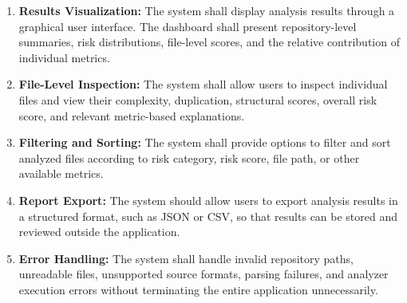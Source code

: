\begin{enumerate}
\begin{itemize}
        \item \textbf{Moderate:} 25--49
        \item \textbf{High:} 50--74
        \item \textbf{Critical:} 75--100
    \end{itemize}
    These categories represent heuristic estimates of potential maintenance concerns rather than the probability of software defects.
    \item \textbf{Results Visualization:} The system shall display analysis results through a graphical user interface. The dashboard shall present repository-level summaries, risk distributions, file-level scores, and the relative contribution of individual metrics.
    \item \textbf{File-Level Inspection:} The system shall allow users to inspect individual files and view their complexity, duplication, structural scores, overall risk score, and relevant metric-based explanations.
    \item \textbf{Filtering and Sorting:} The system shall provide options to filter and sort analyzed files according to risk category, risk score, file path, or other available metrics.
    \item \textbf{Report Export:} The system should allow users to export analysis results in a structured format, such as JSON or CSV, so that results can be stored and reviewed outside the application.
    \item \textbf{Error Handling:} The system shall handle invalid repository paths, unreadable files, unsupported source formats, parsing failures, and analyzer execution errors without terminating the entire application unnecessarily.
\end{enumerate}

